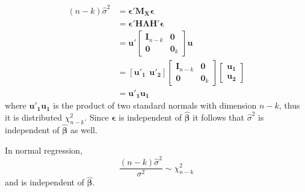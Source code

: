 \documentclass[DIV=14,titlepage=false]{scrreprt}
\begin{document}
\begin{align*}
    (n-k)\hat\sigma^2 &= \boldsymbol{\epsilon}'\mathbf{M_X} \boldsymbol{\epsilon}\\
    &= \boldsymbol{\epsilon}' \mathbf{H}\mathbf{\Lambda} \mathbf{H'} \boldsymbol{\epsilon}\\
    &= \mathbf{u}' \begin{bmatrix}
        \mathbf{I}_{n-k} & \mathbf{0} \\
        \mathbf{0} & \mathbf{0}_k
        \end{bmatrix} \mathbf{u}\\
    &= [\mathbf{u'_1} \hspace{5pt} \mathbf{u'_2}] \begin{bmatrix}
        \mathbf{I}_{n-k} & \mathbf{0} \\
        \mathbf{0} & \mathbf{0}_k
        \end{bmatrix} \begin{bmatrix}
            \mathbf{u_1}\\
            \mathbf{u_2}
        \end{bmatrix}\\
    &=\mathbf{u'_1} \mathbf{u_1}
\end{align*}
where $\mathbf{u'_1} \mathbf{u_1}$ is the product of two standard normals with dimension $n-k$, thus it is distributed $\chi^2_{n-k}$. Since $\boldsymbol{\epsilon}$ is independent of $\boldsymbol{\hat\beta}$ it follows that $\hat\sigma^2$ is independent of $\boldsymbol{\hat\beta}$ as well.
\begin{theorem} 
In normal regression, \[\frac{(n-k)\hat\sigma^2}{\sigma^2}\sim\chi^2_{n-k}\] and is independent of $\boldsymbol{\hat\beta}$.
\end{theorem}
\end{document}
